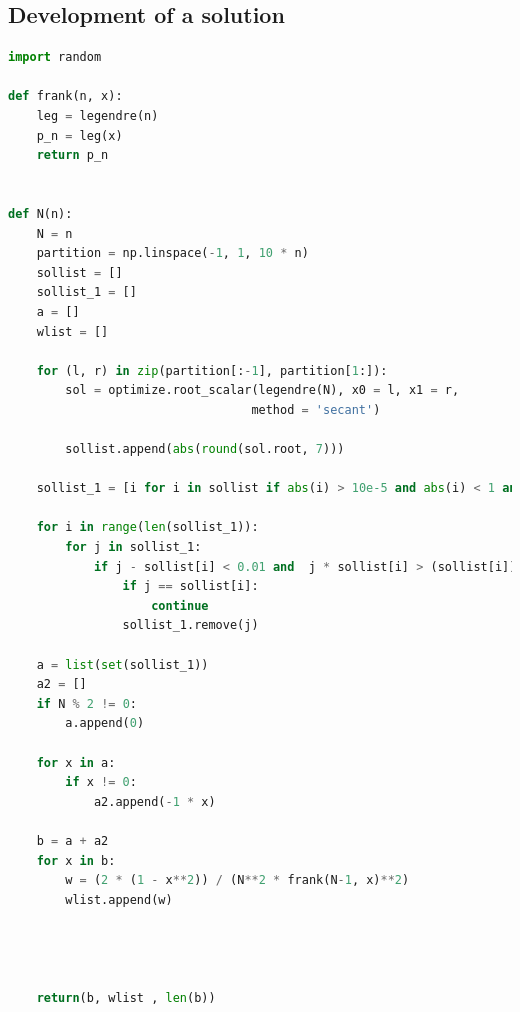 \documentclass[11pt]{article}
\begin{document}
\subsection{Development of a solution} 
\begin{lstlisting}[language=Python]
import random

def frank(n, x):
    leg = legendre(n)
    p_n = leg(x)
    return p_n


def N(n):
    N = n
    partition = np.linspace(-1, 1, 10 * n)
    sollist = []
    sollist_1 = []
    a = []
    wlist = []

    for (l, r) in zip(partition[:-1], partition[1:]):
        sol = optimize.root_scalar(legendre(N), x0 = l, x1 = r,
                                  method = 'secant')
                           
        sollist.append(abs(round(sol.root, 7)))
    
    sollist_1 = [i for i in sollist if abs(i) > 10e-5 and abs(i) < 1 and abs(i) > 0.0617]

    for i in range(len(sollist_1)):
        for j in sollist_1:
            if j - sollist[i] < 0.01 and  j * sollist[i] > (sollist[i])**2:
                if j == sollist[i]:
                    continue
                sollist_1.remove(j)

    a = list(set(sollist_1))
    a2 = []
    if N % 2 != 0:
        a.append(0)

    for x in a:
        if x != 0:
            a2.append(-1 * x)

    b = a + a2
    for x in b:
        w = (2 * (1 - x**2)) / (N**2 * frank(N-1, x)**2)
        wlist.append(w)



    
    return(b, wlist , len(b))
 \end{lstlisting}
 
    
    
\end{document}
